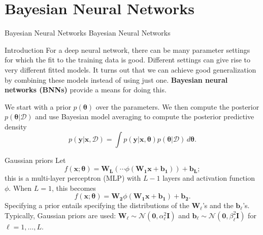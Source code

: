 \documentclass{beamer}
\begin{document}
\section{Bayesian Neural Networks}

\begin{frame}{Bayesian Neural Networks}
    Bayesian Neural Networks
\end{frame}

\begin{frame}{Introduction}
    For a deep neural network, there can be many parameter settings for which the fit to the training data is good. Different settings can give rise to very different fitted models. It turns out that we can achieve good generalization by combining these models instead of using just one. \textbf{Bayesian neural networks (BNNs)} provide a means for doing this.
    
    \medskip
    
    We start with a prior $p(\boldsymbol{\theta})$ over the parameters. We then compute the posterior $p(\boldsymbol{\theta} | \mathcal{D})$ and use Bayesian model averaging to compute the posterior predictive density
    \begin{equation*}
        p(\boldsymbol{y} | \boldsymbol{x}, \mathcal{D}) = \int p(\boldsymbol{y} | \boldsymbol{x}, \boldsymbol{\theta})p(\boldsymbol{\theta} | \mathcal{D})\,d\boldsymbol{\theta}.
    \end{equation*}
\end{frame}

\begin{frame}{Gaussian priors}
    Let
    \[
    f(\boldsymbol{x}; \boldsymbol{\theta}) = \boldsymbol{W_L}(\cdots\phi(\boldsymbol{W_1}\boldsymbol{x} + \boldsymbol{b_1})) + \boldsymbol{b_L};
    \]
    this is a multi-layer perceptron (MLP) with $L - 1$ layers and activation function $\phi$. When $L = 1$, this becomes
    \[
    f(\boldsymbol{x}; \boldsymbol{\theta}) = \boldsymbol{W_2}\phi(\boldsymbol{W_1}\boldsymbol{x} + \boldsymbol{b_1}) + \boldsymbol{b_2}.
    \]
    Specifying a prior entails specifying the distributions of the $\boldsymbol{W}_{\ell}$'s and the $\boldsymbol{b}_{\ell}$'s. Typically, Gaussian priors are used: $\boldsymbol{W}_{\ell} \sim \mathcal{N}(\boldsymbol{0}, \alpha_{\ell}^2\boldsymbol{I})$ and $\boldsymbol{b}_{\ell} \sim \mathcal{N}(\boldsymbol{0}, \beta_{\ell}^2\boldsymbol{I})$ for $\ell = 1, \ldots, L$.
\end{frame}
\end{document}
